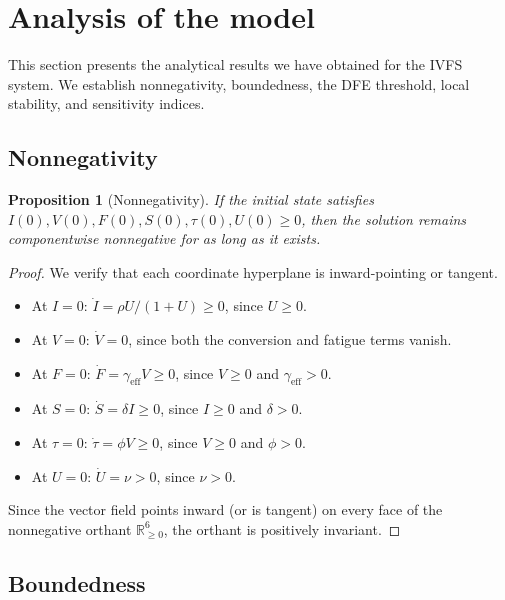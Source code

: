 \documentclass[11pt]{article}
\newtheorem{proposition}{Proposition}
\begin{document}
\section{Analysis of the model}
\label{sec:analysis}

This section presents the analytical results we have obtained for the IVFS system. We establish nonnegativity, boundedness, the DFE threshold, local stability, and sensitivity indices.

\subsection{Nonnegativity}

\begin{proposition}[Nonnegativity]
\label{prop:nonneg}
If the initial state satisfies $I(0), V(0), F(0), S(0), \tau(0), U(0) \geq 0$, then the solution remains componentwise nonnegative for as long as it exists.
\end{proposition}

\begin{proof}
We verify that each coordinate hyperplane is inward-pointing or tangent.
\begin{itemize}[leftmargin=1.5em]
    \item At $I = 0$: $\dot{I} = \rho U/(1+U) \geq 0$, since $U \geq 0$.
    \item At $V = 0$: $\dot{V} = 0$, since both the conversion and fatigue terms vanish.
    \item At $F = 0$: $\dot{F} = \gamma_{\mathrm{eff}} V \geq 0$, since $V \geq 0$ and $\gamma_{\mathrm{eff}} > 0$.
    \item At $S = 0$: $\dot{S} = \delta I \geq 0$, since $I \geq 0$ and $\delta > 0$.
    \item At $\tau = 0$: $\dot{\tau} = \phi V \geq 0$, since $V \geq 0$ and $\phi > 0$.
    \item At $U = 0$: $\dot{U} = \nu > 0$, since $\nu > 0$.
\end{itemize}
Since the vector field points inward (or is tangent) on every face of the nonnegative orthant $\mathbb{R}^6_{\geq 0}$, the orthant is positively invariant.
\end{proof}

\subsection{Boundedness}
\end{document}
